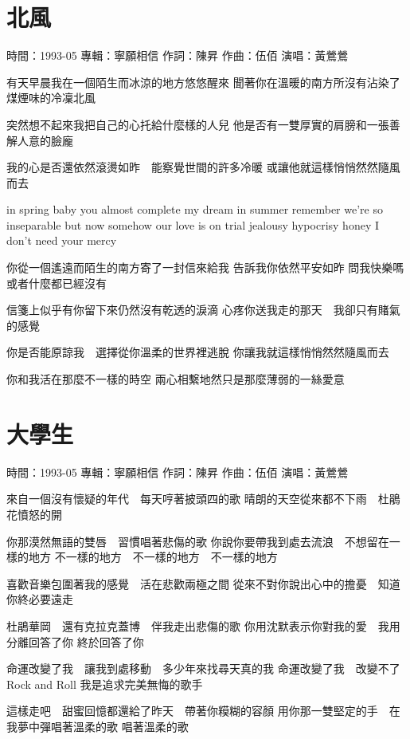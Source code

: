 \documentclass[UTF8,a4paper,oneside,twocolumn,12pt]{ctexbook}
\newcommand{\infopair}[2]{\textbullet #1：#2}
\newcommand{\zc}[1][伍佰]{\infopair{作詞}{#1}}
\newcommand{\zq}[1][伍佰]{\infopair{作曲}{#1}}
\newcommand{\zj}[1]{\infopair{專輯}{#1}}
\newcommand{\sj}[1]{\infopair{時間}{#1}}
\newenvironment{info}{\begin{flushleft}\kaishu
	}
	{\end{flushleft}\normalsize\yahei\par}
\newenvironment{lyric}{
	}
{}
\begin{document}
\section{北風}
\begin{info}
	\sj{1993-05}
	\zj{寧願相信}
	\zc[陳昇]
	\zq
	\infopair{演唱}{黃鶯鶯}
\end{info}
\begin{lyric}
	有天早晨我在一個陌生而冰涼的地方悠悠醒來
	聞著你在溫暖的南方所沒有沾染了煤煙味的冷凜北風

	突然想不起來我把自己的心托給什麼樣的人兒
	他是否有一雙厚實的肩膀和一張善解人意的臉龐

	我的心是否還依然滾燙如昨　能察覺世間的許多冷暖
	或讓他就這樣悄悄然然隨風而去

	in spring baby
	you almost complete my dream
	in summer remember
	we're so inseparable
	but now somehow
	our love is on trial
	jealousy hypocrisy
	honey I don't need your mercy

	你從一個遙遠而陌生的南方寄了一封信來給我
	告訴我你依然平安如昨
	問我快樂嗎　或者什麼都已經沒有

	信箋上似乎有你留下來仍然沒有乾透的淚滴
	心疼你送我走的那天　我卻只有賭氣的感覺

	你是否能原諒我　選擇從你溫柔的世界裡逃脫
	你讓我就這樣悄悄然然隨風而去

	你和我活在那麼不一樣的時空
	兩心相繫地然只是那麼薄弱的一絲愛意
\end{lyric}

\section{大學生}
\begin{info}
	\sj{1993-05}
	\zj{寧願相信}
	\zc[陳昇]
	\zq
	\infopair{演唱}{黃鶯鶯}
\end{info}
\begin{lyric}
	來自一個沒有懷疑的年代　每天哼著披頭四的歌
	晴朗的天空從來都不下雨　杜鵑花憤怒的開

	你那漠然無語的雙唇　習慣唱著悲傷的歌
	你說你要帶我到處去流浪　不想留在一樣的地方
	不一樣的地方　不一樣的地方　不一樣的地方

	喜歡音樂包圍著我的感覺　活在悲歡兩極之間
	從來不對你說出心中的擔憂　知道你終必要遠走

	杜鵑華岡　還有克拉克蓋博　伴我走出悲傷的歌
	你用沈默表示你對我的愛　我用分離回答了你
	終於回答了你

	命運改變了我　讓我到處移動　多少年來找尋天真的我
	命運改變了我　改變不了Rock and Roll
	我是追求完美無悔的歌手

	這樣走吧　甜蜜回憶都還給了昨天　帶著你糢糊的容顏
	用你那一雙堅定的手　在我夢中彈唱著溫柔的歌
	唱著溫柔的歌
\end{lyric}
\end{document}
